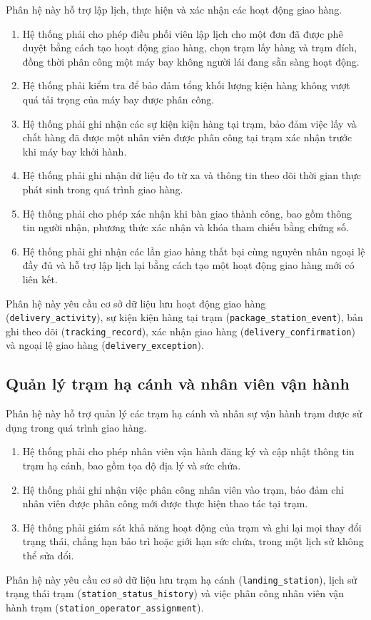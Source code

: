 Phân hệ này hỗ trợ lập lịch, thực hiện và xác nhận các hoạt động giao hàng.
\begin{enumerate}
    \item Hệ thống phải cho phép điều phối viên lập lịch cho một đơn đã được phê duyệt bằng cách tạo hoạt động giao hàng, chọn trạm lấy hàng và trạm đích, đồng thời phân công một máy bay không người lái đang sẵn sàng hoạt động.
    \item Hệ thống phải kiểm tra để bảo đảm tổng khối lượng kiện hàng không vượt quá tải trọng của máy bay được phân công.
    \item Hệ thống phải ghi nhận các sự kiện kiện hàng tại trạm, bảo đảm việc lấy và chất hàng đã được một nhân viên được phân công tại trạm xác nhận trước khi máy bay khởi hành.
    \item Hệ thống phải ghi nhận dữ liệu đo từ xa và thông tin theo dõi thời gian thực phát sinh trong quá trình giao hàng.
    \item Hệ thống phải cho phép xác nhận khi bàn giao thành công, bao gồm thông tin người nhận, phương thức xác nhận và khóa tham chiếu bằng chứng số.
    \item Hệ thống phải ghi nhận các lần giao hàng thất bại cùng nguyên nhân ngoại lệ đầy đủ và hỗ trợ lập lịch lại bằng cách tạo một hoạt động giao hàng mới có liên kết.
\end{enumerate}
Phân hệ này yêu cầu cơ sở dữ liệu lưu hoạt động giao hàng (\texttt{delivery\_activity}), sự kiện kiện hàng tại trạm (\texttt{package\_station\_event}), bản ghi theo dõi (\texttt{tracking\_record}), xác nhận giao hàng (\texttt{delivery\_confirmation}) và ngoại lệ giao hàng (\texttt{delivery\_exception}).

\subsection{Quản lý trạm hạ cánh và nhân viên vận hành}

Phân hệ này hỗ trợ quản lý các trạm hạ cánh và nhân sự vận hành trạm được sử dụng trong quá trình giao hàng.
\begin{enumerate}
    \item Hệ thống phải cho phép nhân viên vận hành đăng ký và cập nhật thông tin trạm hạ cánh, bao gồm tọa độ địa lý và sức chứa.
    \item Hệ thống phải ghi nhận việc phân công nhân viên vào trạm, bảo đảm chỉ nhân viên được phân công mới được thực hiện thao tác tại trạm.
    \item Hệ thống phải giám sát khả năng hoạt động của trạm và ghi lại mọi thay đổi trạng thái, chẳng hạn bảo trì hoặc giới hạn sức chứa, trong một lịch sử không thể sửa đổi.
\end{enumerate}
Phân hệ này yêu cầu cơ sở dữ liệu lưu trạm hạ cánh (\texttt{landing\_station}), lịch sử trạng thái trạm (\texttt{station\_status\_history}) và việc phân công nhân viên vận hành trạm (\texttt{station\_operator\_assignment}).

